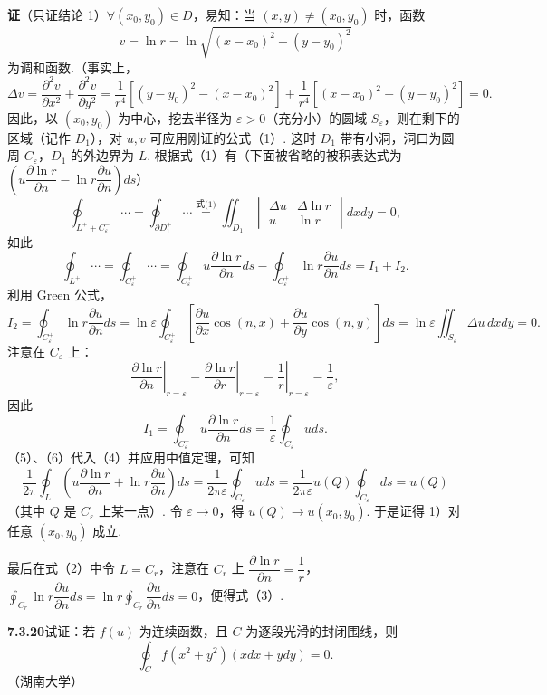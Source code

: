 \documentclass[UTF8,12pt,a4paper,fontset=fandol]{ctexart}
\begin{document}
\noindent\textbf{证}\quad （只证结论 1）$\forall(x_0,y_0)\in D$，易知：当 $(x,y)\ne(x_0,y_0)$ 时，函数
\[
v=\ln r=\ln\sqrt{(x-x_0)^2+(y-y_0)^2}
\]
为调和函数.（事实上，
\[
\Delta v=\frac{\partial^2v}{\partial x^2}+\frac{\partial^2v}{\partial y^2}
=\frac1{r^4}[(y-y_0)^2-(x-x_0)^2]
+\frac1{r^4}[(x-x_0)^2-(y-y_0)^2]=0.
\]
因此，以 $(x_0,y_0)$ 为中心，挖去半径为 $\varepsilon>0$（充分小）的圆域 $S_\varepsilon$，则在剩下的区域（记作 $D_1$），对 $u,v$ 可应用刚证的公式（1）. 这时 $D_1$ 带有小洞，洞口为圆周 $C_\varepsilon$，$D_1$ 的外边界为 $L$. 根据式（1）有（下面被省略的被积表达式为 $\left(u\dfrac{\partial\ln r}{\partial n}-\ln r\dfrac{\partial u}{\partial n}\right)ds$）
\[
\oint_{L^++C_\varepsilon^-}\cdots
=\oint_{\partial D_1^+}\cdots
\overset{\text{式(1)}}{=}
\iint_{D_1}
\begin{vmatrix}
\Delta u & \Delta\ln r\\
u & \ln r
\end{vmatrix}dxdy=0,
\]
如此
\[
\oint_{L^+}\cdots=\oint_{C_\varepsilon^+}\cdots
=\oint_{C_\varepsilon^+}u\frac{\partial\ln r}{\partial n}ds
-\oint_{C_\varepsilon^+}\ln r\frac{\partial u}{\partial n}ds=I_1+I_2.
\tag{4}
\]
利用 Green 公式，
\[
I_2=\oint_{C_\varepsilon^+}\ln r\frac{\partial u}{\partial n}ds
=\ln\varepsilon\oint_{C_\varepsilon^+}
\left[\frac{\partial u}{\partial x}\cos(n,x)
+\frac{\partial u}{\partial y}\cos(n,y)\right]ds
=\ln\varepsilon\iint_{S_\varepsilon}\Delta u\,dxdy=0.
\tag{5}
\]
注意在 $C_\varepsilon$ 上：
\[
\left.\frac{\partial\ln r}{\partial n}\right|_{r=\varepsilon}
=\left.\frac{\partial\ln r}{\partial r}\right|_{r=\varepsilon}
=\left.\frac1r\right|_{r=\varepsilon}=\frac1\varepsilon,
\]
因此
\[
I_1=\oint_{C_\varepsilon^+}u\frac{\partial\ln r}{\partial n}ds
=\frac1\varepsilon\oint_{C_\varepsilon}uds.
\tag{6}
\]
（5）、（6）代入（4）并应用中值定理，可知
\[
\frac1{2\pi}\oint_L\left(u\frac{\partial\ln r}{\partial n}
+\ln r\frac{\partial u}{\partial n}\right)ds
=\frac1{2\pi\varepsilon}\oint_{C_\varepsilon}uds
=\frac1{2\pi\varepsilon}u(Q)\oint_{C_\varepsilon}ds=u(Q)
\]
（其中 $Q$ 是 $C_\varepsilon$ 上某一点）. 令 $\varepsilon\to0$，得 $u(Q)\to u(x_0,y_0)$. 于是证得 1）对任意 $(x_0,y_0)$ 成立.

最后在式（2）中令 $L=C_r$，注意在 $C_r$ 上 $\dfrac{\partial\ln r}{\partial n}=\dfrac1r$，$\displaystyle\oint_{C_r}\ln r\dfrac{\partial u}{\partial n}ds=\ln r\oint_{C_r}\dfrac{\partial u}{\partial n}ds=0$，便得式（3）.

\noindent\textbf{7.3.20}\quad 试证：若 $f(u)$ 为连续函数，且 $C$ 为逐段光滑的封闭围线，则
\[
\oint_Cf(x^2+y^2)(xdx+ydy)=0.
\]
（湖南大学）
\end{document}
